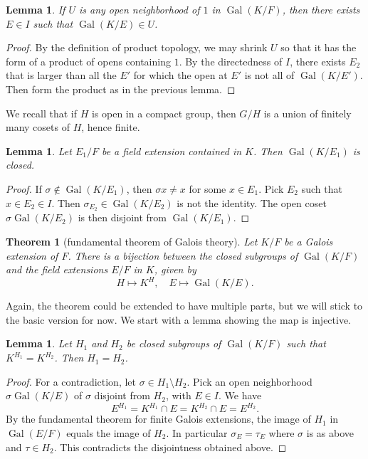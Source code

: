 \documentclass{amsart}
\newtheorem{theorem}[equation]{Theorem}
\newtheorem{lemma}[equation]{Lemma}
\def\op#1{{\operatorname{#1}}}
\def\oG{\op{Gal}}
\begin{document}
\begin{lemma} If $U$ is any open neighborhood of $1$ in $\oG(K/F)$, then
there exists $E\in I$ such that $\oG(K/E)\in U$.
\end{lemma}

\begin{proof}  By the definition of product topology, we may shrink $U$ so that
it has the form of a product of opens containing $1$.  By the directedness of $I$,
there exists $E_2$ that is larger than all the $E'$ for which the open at $E'$ is not all
of $\oG(K/E')$.  Then form the product as in the previous lemma.
\end{proof}

We recall that if $H$ is open in a compact group, then $G/H$ is a union of finitely
many cosets of $H$, hence finite.

\begin{lemma} Let $E_1/F$ be a field extension contained in $K$.  Then $\oG(K/E_1)$
is closed.
\end{lemma}

\begin{proof}  If $\sigma\not\in \oG(K/E_1)$, then $\sigma x\ne x$ for some
$x\in E_1$.  Pick $E_2$ such that $x\in E_2\in I$.  Then $\sigma_{E_2}\in\oG(K/E_2)$
is not the identity.  The open coset $\sigma \oG(K/E_2)$ is then disjoint
from $\oG(K/E_1)$.
\end{proof}

\begin{theorem}[fundamental theorem of Galois theory] Let $K/F$ be a Galois
extension of $F$.  There is a bijection between the closed subgroups of $\oG(K/F)$
and the field extensions $E/F$ in $K$, given by
\[
H \mapsto K^H,\quad E \mapsto \oG(K/E).
\]
\end{theorem}

Again, the theorem could be extended to have multiple parts, but we will
stick to the basic version for now.
We start with a lemma showing the map is injective.

\begin{lemma}  Let $H_1$ and $H_2$ be closed subgroups of $\oG(K/F)$
such that $K^{H_1}=K^{H_2}$.
Then $H_1 = H_2$.
\end{lemma}

\begin{proof} For a contradiction, let $\sigma\in H_1\setminus H_2$.
Pick an open neighborhood $\sigma \oG(K/E)$ of $\sigma$ disjoint from $H_2$,
with $E\in I$.
We have
\[
E^{H_1} = K^{H_1}\cap E = K^{H_2}\cap E = E^{H_2}.
\]
By the fundamental theorem for finite Galois extensions, the image
of $H_1$ in $\oG(E/F)$ equals the image of $H_2$.
In particular $\sigma_E = \tau_E$ where $\sigma$ is as above and $\tau\in H_2$.
This contradicts the disjointness obtained above.
\end{proof}
\end{document}
